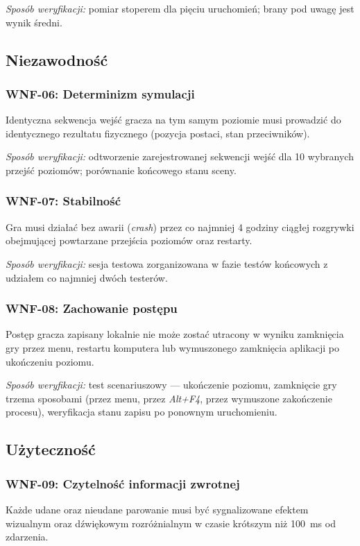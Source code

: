\textit{Sposób weryfikacji:} pomiar stoperem dla pięciu uruchomień; brany pod uwagę jest wynik średni.

\subsection{Niezawodność}

\subsubsection*{WNF-06: Determinizm symulacji}
Identyczna sekwencja wejść gracza na tym samym poziomie musi prowadzić do identycznego rezultatu fizycznego (pozycja postaci, stan przeciwników).

\textit{Sposób weryfikacji:} odtworzenie zarejestrowanej sekwencji wejść dla 10 wybranych przejść poziomów; porównanie końcowego stanu sceny.

\subsubsection*{WNF-07: Stabilność}
Gra musi działać bez awarii (\textit{crash}) przez co najmniej 4 godziny ciągłej rozgrywki obejmującej powtarzane przejścia poziomów oraz restarty.

\textit{Sposób weryfikacji:} sesja testowa zorganizowana w fazie testów końcowych z udziałem co najmniej dwóch testerów.

\subsubsection*{WNF-08: Zachowanie postępu}
Postęp gracza zapisany lokalnie nie może zostać utracony w wyniku zamknięcia gry przez menu, restartu komputera lub wymuszonego zamknięcia aplikacji po ukończeniu poziomu.

\textit{Sposób weryfikacji:} test scenariuszowy --- ukończenie poziomu, zamknięcie gry trzema sposobami (przez menu, przez \textit{Alt+F4}, przez wymuszone zakończenie procesu), weryfikacja stanu zapisu po ponownym uruchomieniu.

\subsection{Użyteczność}

\subsubsection*{WNF-09: Czytelność informacji zwrotnej}
Każde udane oraz nieudane parowanie musi być sygnalizowane efektem wizualnym oraz dźwiękowym rozróżnialnym w czasie krótszym niż 100~ms od zdarzenia.

